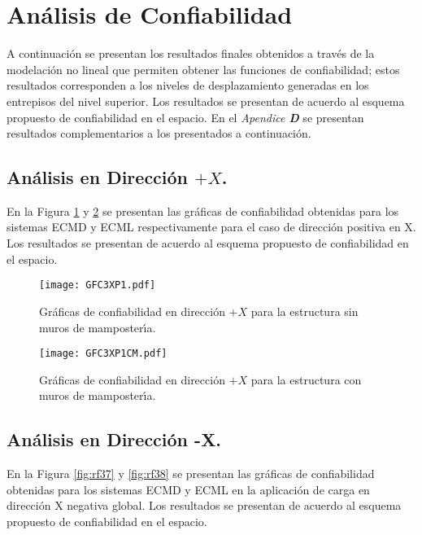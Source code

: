 \section{An\'alisis de Confiabilidad}

A continuaci\'on se presentan los resultados finales obtenidos a trav\'es de la modelaci\'on no lineal que permiten obtener las funciones de confiabilidad; estos resultados corresponden a los niveles de desplazamiento generadas en los entrepisos del nivel superior. Los resultados se presentan de acuerdo al esquema propuesto de confiabilidad en el espacio. En el \emph{Apendice \textbf{D}} se presentan resultados complementarios a los presentados a continuaci\'on.

\subsection{An\'alisis en Direcci\'on $+X$.}

En la Figura \ref{fig:rf31} y \ref{fig:rf32} se presentan las gr\'aficas de confiabilidad obtenidas para los sistemas ECMD y ECML respectivamente para el caso de direcci\'on positiva en X. Los resultados se presentan de acuerdo al esquema propuesto de confiabilidad en el espacio.

\begin{figure} [htbp]
\centering
\texttt{[image: GFC3XP1.pdf]}
\caption{Gr\'aficas de confiabilidad en direcci\'on $+X$ para la estructura sin muros de mamposter\'{\i}a.}
\label{fig:rf31}
\end{figure}

\begin{figure} [htbp]
\centering
\texttt{[image: GFC3XP1CM.pdf]}
\caption{Gr\'aficas de confiabilidad en direcci\'on $+X$ para la estructura con muros de mamposter\'{\i}a.}
\label{fig:rf32}
\end{figure}

\newpage

\subsection{An\'alisis en Direcci\'on -X.}

En la Figura \ref{fig:rf37} y \ref{fig:rf38} se presentan las gr\'aficas de confiabilidad obtenidas para los sistemas ECMD y ECML en la aplicaci\'on de carga en direcci\'on X negativa global. Los resultados se presentan de acuerdo al esquema propuesto de confiabilidad en el espacio.

